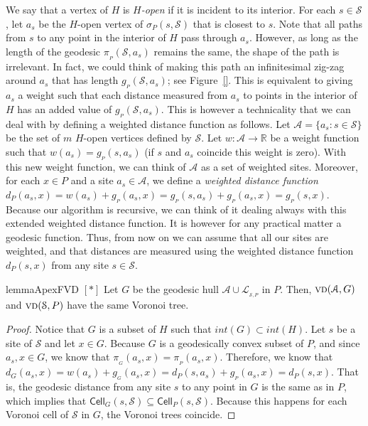 \documentclass[a4paper,UKenglish]{socg-lipics-v2018}
\newcommand{\s}{\mathcal S}
\newcommand{\g}[3][P]{\ensuremath{g{_{_{#1}}}(#2, #3)}}
\newcommand{\dd}[3][P]{\ensuremath{d_{#1}(#2, #3)}}
\newcommand{\p}[3][P]{\ensuremath{\pi_{_{#1}}(#2, #3)}}
\newcommand{\funnel}[2][P]{\ensuremath{\sigma_{\scriptscriptstyle #1}(#2)}}
\newcommand{\cell}[2][P]{\ensuremath{\mathsf{Cell}_{\scriptscriptstyle #1}(#2)}}
\newcommand{\vd}[2][P]{\textsc{vd}(#2, #1)}
\newcommand{\LL}[1][\s, P]{\ensuremath{\mathcal L_{_{#1}}}}
\newcommand{\A}{\ensuremath{\mathcal A}}
\begin{document}
We say that a vertex of $H$ is \emph{$H$-open} if it is incident to its interior.
For each $s\in \s$, let $a_s$ be the $H$-open vertex of $\funnel{s, \s}$ that is closest to $s$. 
Note that all paths from $s$ to any point in the interior of $H$ pass through $a_s$.
However, as long as the length of the geodesic $\p{\s}{a_s}$ remains the same, the shape of the path is irrelevant. 
In fact, we could think of making this path an infinitesimal zig-zag around $a_s$ that has length $\g{\s}{a_s}$; see Figure~\ref{}.
This is equivalent to giving $a_s$ a weight such that each distance measured from $a_s$ to points in the interior of $H$ has 
an added value of $\g{\s}{a_s}$. 
This is however a technicality that we can deal with by defining a weighted distance function as follows.
Let $\A = \{a_s: s\in \s\}$ be the set of $m$ $H$-open vertices defined by $\s$.
Let $w: \A\to \mathbb{R}$ be a weight function such that $w(a_s) = \g{s}{a_s}$ (if $s$ and $a_s$ coincide this weight is zero).
With this new weight function, we can think of $\A$ as a set of weighted sites.
Moreover, for each $x\in P$ and a site $a_s\in \A$, 
we define a \emph{weighted distance function} $\dd{a_s}{x} = w(a_s) + \g{a_s}{x} = \g{s}{a_s} + \g{a_s}{x} = \g{s}{x}$.
Because our algorithm is recursive, we can think of it dealing always with this extended weighted distance function.
It is however for any practical matter a geodesic function.
Thus, from now on we can assume that all our sites are weighted, and that distances are measured using the weighted distance function $\dd{s}{x}$ from any site $s\in \s$.

\begin{restatable}{lemma}{ApexFVD}\label{lemma:ApexFVD}
$[*]$ Let $G$ be the geodesic hull $\A\cup \LL$ in $P$.
Then, $\vd[G]{\A}$ and $\vd[P]{\s}$ have the same Voronoi tree.
\end{restatable}
\begin{proof}
Notice that $G$ is a subset of $H$ such that $int(G)\subset int(H)$.
Let $s$ be a site of $\s$ and let $x\in G$. 
Because $G$ is a geodesically convex subset of $P$, and since $a_s, x\in G$, we know that $\p[G]{a_s}{x} = \p{a_s}{x}$. 
Therefore, we know that  $\dd[G]{a_s}{x} = w(a_s) + \g[G]{a_s}{x} = \dd{s}{a_s} + \g{a_s}{x} = \dd{s}{x}$. 
That is, the geodesic distance from any site $s$ to any point in $G$ is the same as in $P$, which implies that $\cell[G]{s, \s} \subseteq \cell{s, \s}$. 
Because this happens for each Voronoi cell of $\s$ in $G$, the Voronoi trees coincide. 
\end{proof}
\end{document}
